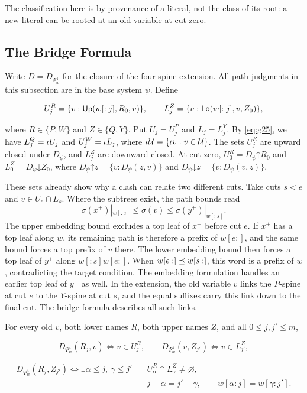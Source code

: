 The classification here is by provenance of a literal, not the class of its
root: a new literal can be rooted at an old variable at cut zero.

\subsection{The Bridge Formula}\label{sec:bridge-formula}
Write $D=D_{\Psi^4_w}$ for the closure of the four-spine extension.
All path judgments in this subsection are in the base system $\psi$. Define

\begin{equation}\label{eq:g31}
U^R_j=\{v:\mathsf{Up}(w[:j],R_0,v)\},\qquad
 L^Z_j=\{v:\mathsf{Lo}(w[:j],v,Z_0)\},
\end{equation}

where $R\in\{P,W\}$ and $Z\in\{Q,Y\}$. Put $U_j=U^P_j$ and $L_j=L^Y_j$. By \eqref{eq:g25}, we have
$L^Q_j=\iota U_j$ and $U^W_j=\iota L_j$, where $\iota\mathcal U=\{\iota v:v\in\mathcal U\}$.
The sets $U^R_j$ are upward closed under $D_\psi$, and $L^Z_j$ are
downward closed. At cut zero,
$U^R_0=D_\psi\mathord\uparrow R_0$ and
$L^Z_0=D_\psi\mathord\downarrow Z_0$, where
$D_\psi\mathord\uparrow z=\{v:D_\psi(z,v)\}$ and
$D_\psi\mathord\downarrow z=\{v:D_\psi(v,z)\}$.

These sets already show why a clash can relate two different cuts. Take
cuts $s<e$ and $v\in U_e\cap L_s$. Where the subtrees exist, the path
bounds read
\[
 \sigma(x^+)|_{w[:e]}\le\sigma(v)\le\sigma(y^+)|_{w[:s]}.
\]
The upper embedding bound excludes a top leaf of $x^+$ before cut $e$.
If $x^+$ has a top leaf along $w$, its remaining path is therefore a
prefix of $w[e:]$, and the same bound forces a top prefix of $v$ there.
The lower embedding bound then forces a top leaf of
$y^+$ along $w[:s]w[e:]$. When $w[e:]\preceq w[s:]$, this word is a prefix
of $w$, contradicting the target condition. The embedding formulation
handles an earlier top leaf of $y^+$ as well. In the extension, the old
variable $v$ links the $P$-spine at cut $e$ to the $Y$-spine at cut $s$,
and the equal suffixes carry this link down to the final cut. The bridge
formula describes all such links.

\begin{lemma}\label{lem:bridge}
For every old $v$, both lower names $R$, both upper names $Z$, and all $0\le j,j'\le m$,

\begin{equation}\label{eq:g32}
D_{\Psi^4_w}(R_j,v)\iff v\in U^R_j,
 \qquad D_{\Psi^4_w}(v,Z_{j'})\iff v\in L^Z_{j'},
\end{equation}

\begin{equation}\label{eq:g33}
\begin{split}
 D_{\Psi^4_w}(R_j,Z_{j'})\iff
 \exists \alpha\le j,\ \gamma\le j'\quad&
 U^R_\alpha\cap L^Z_\gamma\ne\varnothing,\\
 &j-\alpha=j'-\gamma,\qquad w[\alpha:j]=w[\gamma:j'].
 \end{split}
\end{equation}

\end{lemma}

